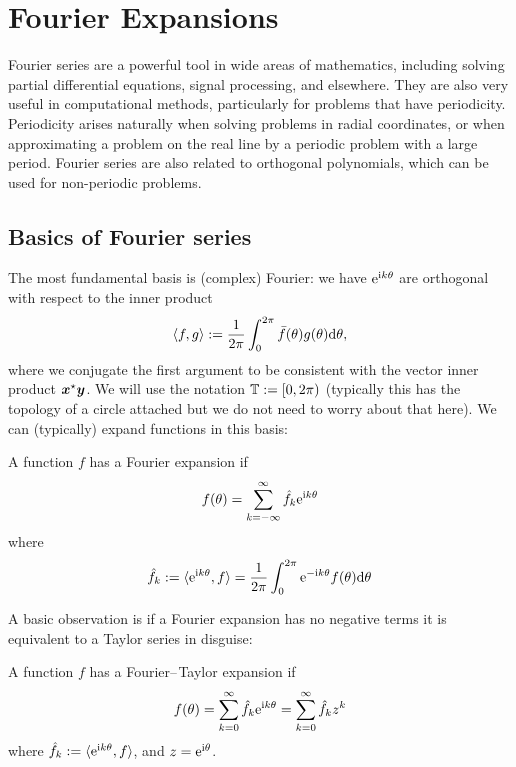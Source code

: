
\section{Fourier Expansions}
Fourier series are a powerful tool in wide areas of mathematics, including solving partial differential equations, signal processing, and elsewhere. They are also very useful in computational methods, particularly for problems that have periodicity. Periodicity arises naturally when solving problems in radial coordinates, or when approximating a problem on the real line by a periodic problem with a large period. Fourier series are also related to orthogonal polynomials, which can be used for non-periodic problems.

\subsection{Basics of Fourier series}
The most fundamental basis is (complex) Fourier: we have ${\rm e}^{{\rm i} k \theta}$ are orthogonal with respect to the inner product
\[
\ensuremath{\langle}f, g \ensuremath{\rangle} := {1 \over 2\ensuremath{\pi}} \ensuremath{\int}_0^{2\ensuremath{\pi}} \bar f(\ensuremath{\theta}) g(\ensuremath{\theta}) {\rm d}\ensuremath{\theta},
\]
where we conjugate the first argument to be consistent with the vector inner product $\bm{{\mbox{\boldmath$x$\unboldmath}}}^\star \bm{{\mbox{\boldmath$y$\unboldmath}}}$. We will use the notation ${\mathbb T} := [0,2\pi)$ (typically this has the topology of a circle attached but we do not need to worry about that here). We can (typically) expand functions in this basis:

\begin{definition}[Fourier] A function $f$ has a Fourier expansion if
\[
f(\theta) = \sum_{k = -\infty}^\infty \hat f_k {\rm e}^{{\rm i} k \theta}
\]
where
\[
\hat f_k := \langle{\rm e}^{{\rm i} k \theta}, f\rangle = {1 \over 2\pi} \int_0^{2\pi}  {\rm e}^{-{\rm i} k \theta} f(\theta) {\rm d}\theta
\]
\end{definition}

A basic observation is if a Fourier expansion has no negative terms it is equivalent to a Taylor series in disguise:

\begin{definition} A function $f$ has a Fourier\ensuremath{\endash}Taylor expansion if
\[
f(\theta) = \sum_{k = 0}^\infty \hat f_k {\rm e}^{{\rm i} k \theta} = \sum_{k = 0}^\infty \hat f_k z^k
\]
where $\hat f_k := \langle{\rm e}^{{\rm i} k \theta}, f\rangle$, and $z = {\rm e}^{{\rm i} \theta}$. \end{definition}

